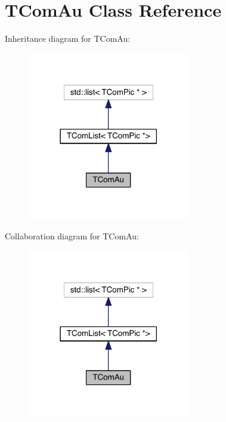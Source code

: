 \hypertarget{class_t_com_au}{}\section{T\+Com\+Au Class Reference}
\label{class_t_com_au}


Inheritance diagram for T\+Com\+Au\+:
\nopagebreak
\begin{figure}[H]
\begin{center}
\leavevmode
\includegraphics[width=201pt]{db/d13/class_t_com_au__inherit__graph}
\end{center}
\end{figure}


Collaboration diagram for T\+Com\+Au\+:
\nopagebreak
\begin{figure}[H]
\begin{center}
\leavevmode
\includegraphics[width=201pt]{dd/dff/class_t_com_au__coll__graph}
\end{center}
\end{figure}
